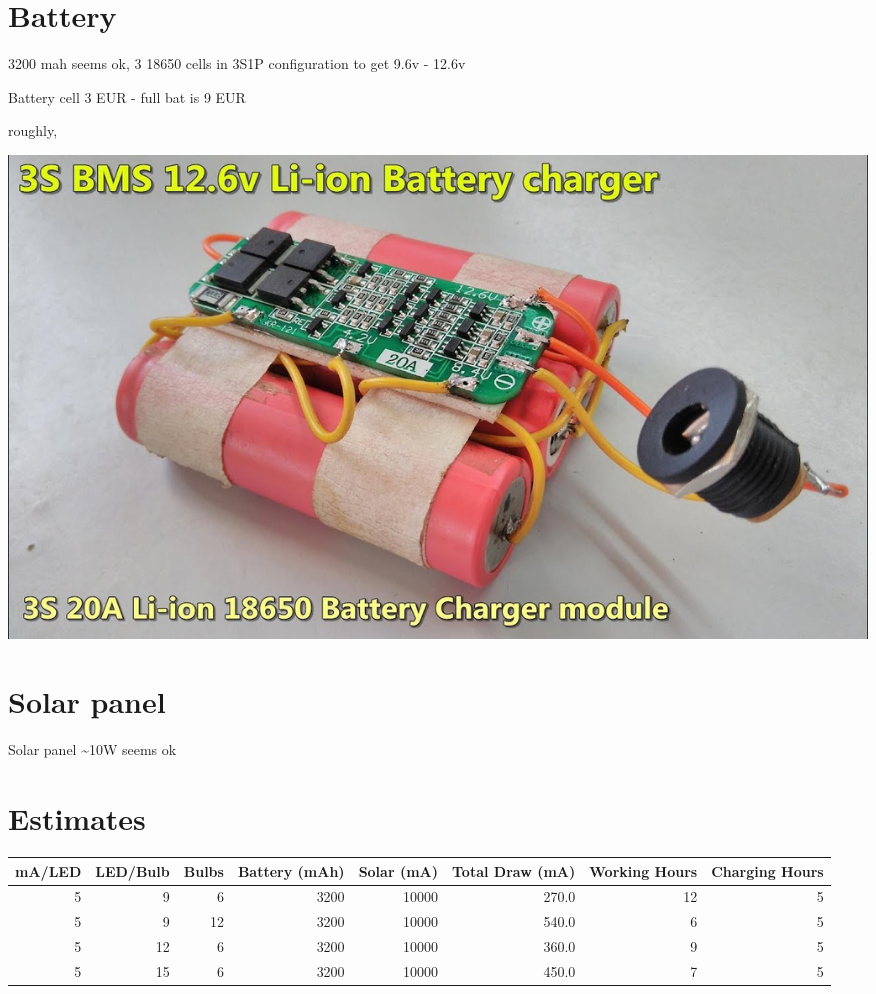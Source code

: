 \documentclass[11pt]{article}
\begin{document}
\section{Battery}
\label{sec:orgaace87d}
3200 mah seems ok,
3 18650 cells in 3S1P configuration to get 9.6v - 12.6v

Battery cell 3 EUR - full bat is 9 EUR

roughly,

\begin{center}
\includegraphics[width=.9\linewidth]{./samples/battery.jpg}
\end{center}

\section{Solar panel}
\label{sec:orgacfab00}
Solar panel \textasciitilde{}10W seems ok

\section{Estimates}
\label{sec:org76c40c6}

\begin{center}
\begin{tabular}{rrrrrrrr}
mA/LED & LED/Bulb & Bulbs & Battery (mAh) & Solar (mA) & Total Draw (mA) & Working Hours & Charging Hours\\
\hline
5 & 9 & 6 & 3200 & 10000 & 270.0 & 12 & 5\\
5 & 9 & 12 & 3200 & 10000 & 540.0 & 6 & 5\\
5 & 12 & 6 & 3200 & 10000 & 360.0 & 9 & 5\\
5 & 15 & 6 & 3200 & 10000 & 450.0 & 7 & 5\\
\end{tabular}
\end{center}
\end{document}
